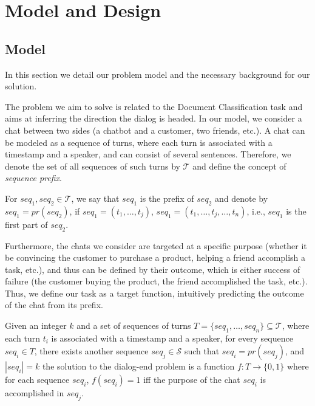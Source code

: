 \section{Model and Design}\label{sec:model}

\subsection{Model}
In this section we detail our problem model and the necessary background 
for our solution.

The problem we aim to solve is related to the Document Classification task 
\cite{DBLP:conf/naacl/YangYDHSH16,Slonim:2002:UDC:564376.564401,DBLP:journals/tkde/IsaLKR08} 
and aims at inferring the direction the dialog is headed. 
In our model, we consider a chat between two sides (a chatbot and a customer, two friends, etc.). 
A chat can be modeled as a sequence of turns, 
where each turn is associated with a timestamp and a speaker, and can consist of several sentences. 
Therefore, we denote the set of all sequences of 
such turns by $\mathcal{T}$ and define the concept of {\em sequence prefix}. 

\begin{definition}
For $seq_1, seq_2 \in \mathcal{T}$, we say that $seq_1$ is the 
prefix of $seq_2$ and denote by $seq_1 = pr(seq_2)$, if 
$seq_1 = (t_1, \ldots, t_j)$, $seq_1 = (t_1, \ldots, t_j, \ldots, t_n)$, i.e., $seq_1$ is the 
first part of $seq_2$.
\end{definition}

Furthermore, the chats we consider are targeted at a specific purpose 
(whether it be convincing the customer to purchase a product, helping a friend accomplish a task, etc.), and thus can be defined by their outcome, which 
is either success of failure (the customer buying the product, the friend accomplished the task, etc.). Thus, we define our task as a target function, intuitively predicting the outcome of the chat from its prefix.

\begin{definition}
Given an integer $k$ and a set of sequences of turns $T=\{seq_1, \ldots, seq_n\} \subseteq \mathcal{T}$,
where each turn $t_i$ is associated with a timestamp and a speaker, for every sequence $seq_i\in T$, there exists another sequence $seq_j\in \mathcal{S}$ such that $seq_i = pr(seq_j)$, and $|seq_i| = k$ the solution to the dialog-end 
problem is a function $f:T \to \{0,1\}$ where for each sequence $seq_i$, $f(seq_i) = 1$ iff the purpose of the chat $seq_i$ is accomplished in $seq_j$. 
\end{definition}

